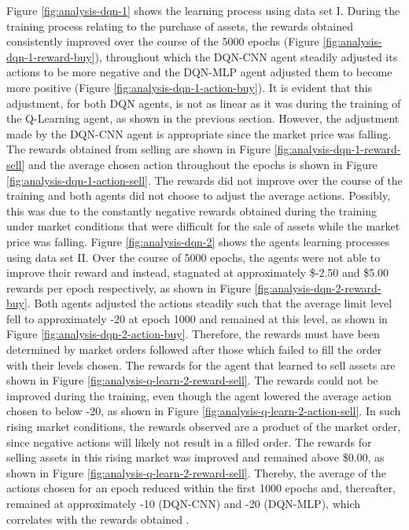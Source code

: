 Figure \ref{fig:analysis-dqn-1} shows the learning process using data set I.
During the training process relating to the purchase of assets, the rewards obtained consistently improved over the course of the 5000 epochs (Figure \ref{fig:analysis-dqn-1-reward-buy}), throughout which the DQN-CNN agent steadily adjusted its actions to be more negative and the DQN-MLP agent adjusted them to become more positive (Figure \ref{fig:analysis-dqn-1-action-buy}).
It is evident that this adjustment, for both DQN agents, is not as linear as it was during the training of the Q-Learning agent, as shown in the previous section.
However, the adjustment made by the DQN-CNN agent is appropriate since the market price was falling.
The rewards obtained from selling are shown in Figure \ref{fig:analysis-dqn-1-reward-sell} and the average chosen action throughout the epochs is shown in Figure \ref{fig:analysis-dqn-1-action-sell}.
The rewards did not improve over the course of the training and both agents did not choose to adjust the average actions.
Possibly, this was due to the constantly negative rewards obtained during the training under market conditions that were difficult for the sale of assets while the market price was falling.
Figure \ref{fig:analysis-dqn-2} shows the agents learning processes using data set II.
Over the course of 5000 epochs, the agents were not able to improve their reward and instead, stagnated at approximately \$-2.50 and \$5.00 rewards per epoch respectively, as shown in Figure \ref{fig:analysis-dqn-2-reward-buy}.
Both agents adjusted the actions steadily such that the average limit level fell to approximately -20 at epoch 1000 and remained at this level, as shown in Figure \ref{fig:analysis-dqn-2-action-buy}.
Therefore, the rewards must have been determined by market orders followed after those which failed to fill the order with their levels chosen.
The rewards for the agent that learned to sell assets are shown in Figure \ref{fig:analysis-q-learn-2-reward-sell}.
The rewards could not be improved during the training, even though the agent lowered the average action chosen to below -20, as shown in Figure \ref{fig:analysis-q-learn-2-action-sell}.
In such rising market conditions, the rewards observed are a product of the market order, since negative actions will likely not result in a filled order.
The rewards for selling assets in this rising market was improved and remained above \$0.00, as shown in Figure \ref{fig:analysis-q-learn-2-reward-sell}.
Thereby, the average of the actions chosen for an epoch reduced within the first 1000 epochs and, thereafter, remained at approximately -10 (DQN-CNN) and -20 (DQN-MLP), which correlates with the rewards obtained .
